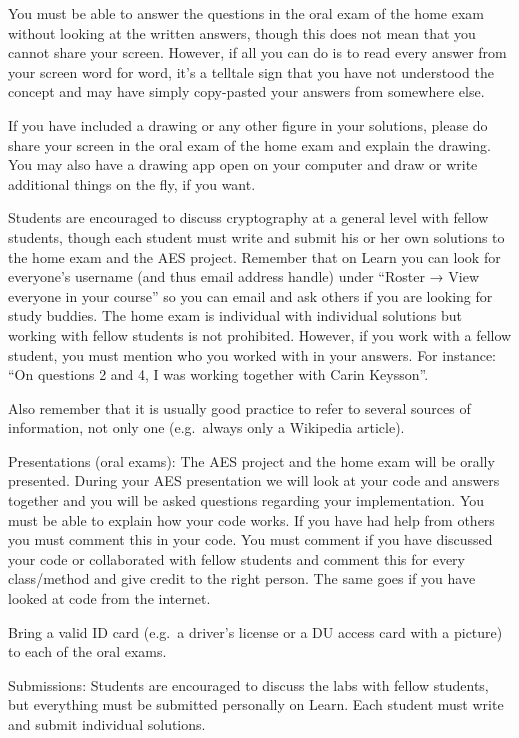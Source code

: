 \documentclass[11pt]{article}
\begin{document}
You must be able to answer the questions in the oral exam of the home
exam without looking at the written answers, though this does not mean
that you cannot share your screen. However, if all you can do is to read
every answer from your screen word for word, it's a telltale sign that
you have not understood the concept and may have simply copy-pasted your
answers from somewhere else.

If you have included a drawing or any other figure in your solutions,
please do share your screen in the oral exam of the home exam and
explain the drawing. You may also have a drawing app open on your
computer and draw or write additional things on the fly, if you want.

Students are encouraged to discuss cryptography at a general level with
fellow students, though each student must write and submit his or her
own solutions to the home exam and the AES project. Remember that on
Learn you can look for everyone's username (and thus email address
handle) under ``Roster → View everyone in your course'' so you can email
and ask others if you are looking for study buddies. The home exam is
individual with individual solutions but working with fellow students is
not prohibited. However, if you work with a fellow student, you must
mention who you worked with in your answers. For instance: ``On
questions 2 and 4, I was working together with Carin Keysson''.

Also remember that it is usually good practice to refer to several
sources of information, not only one (e.g.~always only a Wikipedia
article).

Presentations (oral exams): The AES project and the home exam will be
orally presented. During your AES presentation we will look at your code
and answers together and you will be asked questions regarding your
implementation. You must be able to explain how your code works. If you
have had help from others you must comment this in your code. You must
comment if you have discussed your code or collaborated with fellow
students and comment this for every class/method and give credit to the
right person. The same goes if you have looked at code from the
internet.

Bring a valid ID card (e.g.~a driver's license or a DU access card with
a picture) to each of the oral exams.

Submissions: Students are encouraged to discuss the labs with fellow
students, but everything must be submitted personally on Learn. Each
student must write and submit individual solutions.
\end{document}
